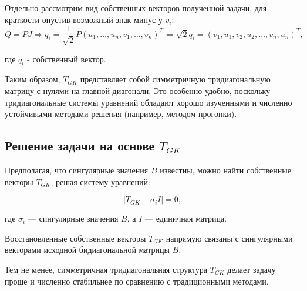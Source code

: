 Отдельно рассмотрим вид собственных векторов полученной задачи, для краткости опустив возможный знак минус у \(v_i\):
\[
    Q=PJ \Rightarrow q_{i}=\frac{1}{\sqrt{2}}P(u_1,\dots,u_n,v_1,\dots,v_n)^T \Leftrightarrow \sqrt{2}q_i=(v_1,u_1,v_2,u_2,\dots,v_n,u_n)^T, 
\]

где \(q_i\) - собственный вектор.

Таким образом, \( T_{GK} \) представляет собой симметричную тридиагональную матрицу с нулями на главной диагонали. Это особенно удобно, поскольку тридиагональные системы уравнений обладают хорошо изученными и численно устойчивыми методами решения (например, методом прогонки).



\subsection{Решение задачи на основе \( T_{GK} \)}

Предполагая, что сингулярные значения \( B \) известны, можно найти собственные векторы \( T_{GK} \), решая систему уравнений:

\begin{equation}
| T_{GK} - \sigma_i I | = 0,
\end{equation}

где \( \sigma_i \) — сингулярные значения \( B \), а \( I \) — единичная матрица.

Восстановленные собственные векторы \( T_{GK} \) напрямую связаны с сингулярными векторами исходной бидиагональной матрицы \( B \).

Тем не менее, симметричная тридиагональная структура \( T_{GK} \) делает задачу проще и численно стабильнее по сравнению с традиционными методами.


